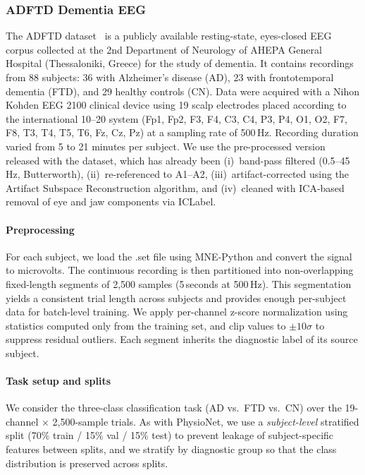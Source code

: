 \documentclass[conference]{IEEEtran}
\begin{document}
\subsubsection{ADFTD Dementia EEG}
\label{sec:adftd}

The ADFTD dataset~\cite{miltiadous2023dataset} is a publicly available resting-state, eyes-closed EEG corpus collected at the 2nd Department of Neurology of AHEPA General Hospital (Thessaloniki, Greece) for the study of dementia.
It contains recordings from 88 subjects: 36 with Alzheimer's disease (AD), 23 with frontotemporal dementia (FTD), and 29 healthy controls (CN).
Data were acquired with a Nihon Kohden EEG 2100 clinical device using 19 scalp electrodes placed according to the international 10--20 system (Fp1, Fp2, F3, F4, C3, C4, P3, P4, O1, O2, F7, F8, T3, T4, T5, T6, Fz, Cz, Pz) at a sampling rate of 500\,Hz.
Recording duration varied from 5 to 21 minutes per subject.
We use the pre-processed version released with the dataset, which has already been (i)~band-pass filtered (0.5--45\,Hz, Butterworth), (ii)~re-referenced to A1--A2, (iii)~artifact-corrected using the Artifact Subspace Reconstruction algorithm, and (iv)~cleaned with ICA-based removal of eye and jaw components via ICLabel.

\paragraph{Preprocessing}
For each subject, we load the .set file using MNE-Python and convert the signal to microvolts.
The continuous recording is then partitioned into non-overlapping fixed-length segments of 2{,}500 samples (5\,seconds at 500\,Hz).
This segmentation yields a consistent trial length across subjects and provides enough per-subject data for batch-level training.
We apply per-channel z-score normalization using statistics computed only from the training set, and clip values to $\pm 10\sigma$ to suppress residual outliers.
Each segment inherits the diagnostic label of its source subject.

\paragraph{Task setup and splits}
We consider the three-class classification task (AD vs.\ FTD vs.\ CN) over the 19-channel $\times$ 2{,}500-sample trials.
As with PhysioNet, we use a \emph{subject-level} stratified split (70\% train / 15\% val / 15\% test) to prevent leakage of subject-specific features between splits, and we stratify by diagnostic group so that the class distribution is preserved across splits.
\end{document}
